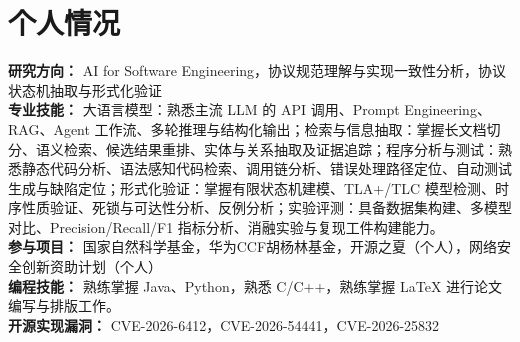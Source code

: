 \documentclass{resume}
\begin{document}
\newpage
\section{个人情况}
\noindent \textbf{研究方向：} AI for Software Engineering，协议规范理解与实现一致性分析，协议状态机抽取与形式化验证 \\[0.5ex]
\noindent \textbf{专业技能：} 大语言模型：熟悉主流 LLM 的 API 调用、Prompt Engineering、RAG、Agent 工作流、多轮推理与结构化输出；检索与信息抽取：掌握长文档切分、语义检索、候选结果重排、实体与关系抽取及证据追踪；程序分析与测试：熟悉静态代码分析、语法感知代码检索、调用链分析、错误处理路径定位、自动测试生成与缺陷定位；形式化验证：掌握有限状态机建模、TLA+/TLC 模型检测、时序性质验证、死锁与可达性分析、反例分析；实验评测：具备数据集构建、多模型对比、Precision/Recall/F1 指标分析、消融实验与复现工件构建能力。\\[0.5ex]
\noindent \textbf{参与项目：} 国家自然科学基金，华为CCF胡杨林基金，开源之夏（个人），网络安全创新资助计划（个人）\\[0.5ex]
\noindent \textbf{编程技能：} 熟练掌握 Java、Python，熟悉 C/C++，熟练掌握 LaTeX 进行论文编写与排版工作。\\[0.5ex]
\noindent \textbf{开源实现漏洞：} CVE-2026-6412，CVE-2026-54441，CVE-2026-25832 \\[0.5ex]





%
%
\end{document}
